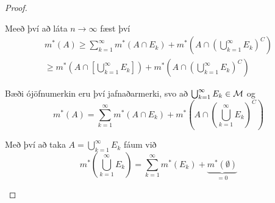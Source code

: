 \documentclass[12pt]{book} \usepackage[utf8]{inputenc}
\begin{document}
\begin{proof}
\begin{enumerate}[(i)]
\begin{itemize}
      Meeð því að láta $n \to \infty$ fæst því
      \begin{gather*}
        m^*(A) \geq \sum_{k=1}^{\infty} m^*(A \cap E_k)
        + m^*(A \cap (\bigcup_{k=1}^{\infty} E_k)^C)\\
        \geq m^*(A \cap [\bigcup_{k=1}^{\infty} E_k]) + m^*(A \cap
        (\bigcup_{k=1}^{\infty} E_k)^C)
      \end{gather*}

      Bæði ójöfnumerkin eru því jafnaðarmerki, svo að
      $\bigcup_{k=1}^{\infty} E_k \in \mathcal{M}$ og
      \[ m^*(A) = \sum_{k=1}^{\infty} m^*(A \cap E_k) + m^*(A \cap
      (\bigcup_{k=1}^{\infty} E_k)^C) \]

      Með því að taka $A = \bigcup_{k=1}^{\infty} E_k$ fáum
      við
      \[m^*(\bigcup_{k=1}^{\infty} E_k) = \sum_{k=1}^{\infty}
      m^*(E_k) + \underbrace{m^*(\emptyset)}_{= 0}\]
    \end{itemize}
  \end{enumerate}
\end{proof}
\subsection{}
\end{document}
